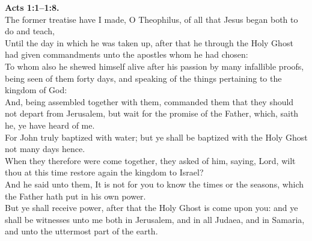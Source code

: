 \documentclass[10pt]{article} %
\begin{document}
{\begin{minipage}[t]{0.45\textwidth}
\textbf{Acts 1:1--1:8.}\\
The former treatise have I made, O Theophilus, of all that Jesus began both to do and teach,\\
Until the day in which he was taken up, after that he through the Holy Ghost had given commandments unto the apostles whom he had chosen:\\
To whom also he shewed himself alive after his passion by many infallible proofs, being seen of them forty days, and speaking of the things pertaining to the kingdom of God:\\
And, being assembled together with them, commanded them that they should not depart from Jerusalem, but wait for the promise of the Father, which, saith he, ye have heard of me.\\
For John truly baptized with water; but ye shall be baptized with the Holy Ghost not many days hence.\\
When they therefore were come together, they asked of him, saying, Lord, wilt thou at this time restore again the kingdom to Israel?\\
And he said unto them, It is not for you to know the times or the seasons, which the Father hath put in his own power.\\
But ye shall receive power, after that the Holy Ghost is come upon you: and ye shall be witnesses unto me both in Jerusalem, and in all Judaea, and in Samaria, and unto the uttermost part of the earth.\\

\end{minipage}}
\vspace*{\fill}
\newpage
\Huge%
\vspace*{\fill}
\begin{spacing}{1.1}%
\end{spacing}
\vspace*{\fill}
\end{document}
